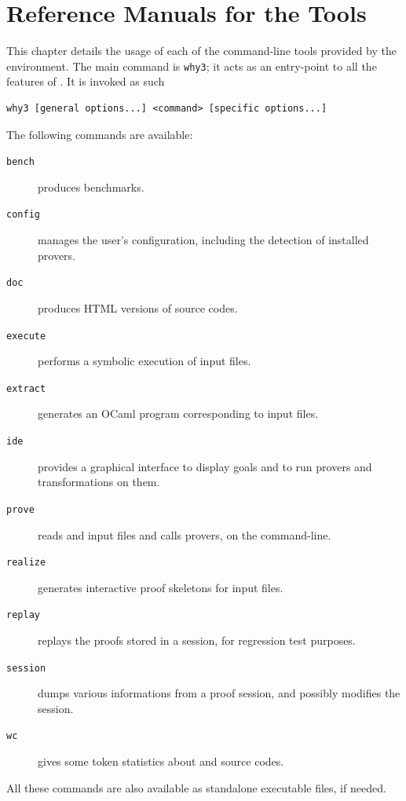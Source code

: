 \chapter{Reference Manuals for the \why Tools}
\label{chap:manpages}

This chapter details the usage of each of the command-line tools
provided by the \why environment. The main command is \texttt{why3};
it acts as an entry-point to all the features of \why. It is invoked
as such
\begin{verbatim}
why3 [general options...] <command> [specific options...]
\end{verbatim}

The following commands are available:
\begin{description}
\item[\texttt{bench}] produces benchmarks.
\item[\texttt{config}] manages the user's configuration,
  including the detection of installed provers.
\item[\texttt{doc}] produces HTML versions of \why source codes.
\item[\texttt{execute}] performs a symbolic execution of \whyml
  input files.
\item[\texttt{extract}] generates an OCaml program corresponding to
  \whyml input files.
\item[\texttt{ide}] provides a graphical interface to display goals
  and to run provers and transformations on them.
\item[\texttt{prove}] reads \why and \whyml input files and calls
  provers, on the command-line.
\item[\texttt{realize}] generates interactive proof skeletons for
  \why input files.
\item[\texttt{replay}] replays the proofs stored in a session,
  for regression test purposes.
\item[\texttt{session}] dumps various informations from a proof
  session, and possibly modifies the session.
\item[\texttt{wc}] gives some token statistics about \why and \whyml
  source codes.
\end{description}

All these commands are also available as standalone executable files,
if needed.

